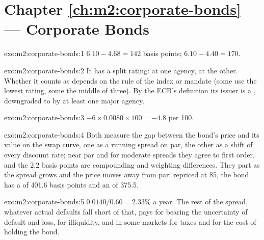 \section*{Chapter \ref{ch:m2:corporate-bonds} --- Corporate Bonds}

\begin{solution}{exo:m2:corporate-bonds:1}
 $6.10 - 4.68 = 142$ basis points;  $6.10 - 4.40 = 170$.
\end{solution}

\begin{solution}{exo:m2:corporate-bonds:2}
It has a split rating:  at one agency,  at the other. Whether
it counts as  depends on the rule of the index or mandate (some use
the lowest rating, some the middle of three). By the ECB's definition its issuer is a
, downgraded to  by at least one major agency.
\end{solution}

\begin{solution}{exo:m2:corporate-bonds:3}
$-6 \times 0.0080 \times 100 = -4.8$ per 100.
\end{solution}

\begin{solution}{exo:m2:corporate-bonds:4}
Both measure the gap between the bond's price and its value on the swap curve, one as
a running spread on par, the other as a shift of every discount rate; near par and
for moderate spreads they agree to first order, and the 2.2 basis points are
compounding and weighting differences. They part as the spread grows and the price
moves away from par: repriced at 85, the bond has a  of 401.6 basis points and
an  of 375.5.
\end{solution}

\begin{solution}{exo:m2:corporate-bonds:5}
$0.0140/0.60 = 2.33\%$ a year. The rest of the spread, whatever actual defaults fall
short of that, pays for bearing the uncertainty of default and loss, for
illiquidity, and in some markets for taxes and for the cost of holding the bond.
\end{solution}

